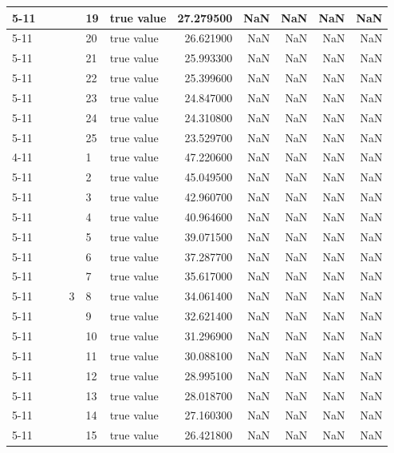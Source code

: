 \begin{tabular}{llllllrrrrr}
\cline{5-11}
 &  &  &  & 19 & true value & 27.279500 & NaN & NaN & NaN & NaN \\
\cline{5-11}
 &  &  &  & 20 & true value & 26.621900 & NaN & NaN & NaN & NaN \\
\cline{5-11}
 &  &  &  & 21 & true value & 25.993300 & NaN & NaN & NaN & NaN \\
\cline{5-11}
 &  &  &  & 22 & true value & 25.399600 & NaN & NaN & NaN & NaN \\
\cline{5-11}
 &  &  &  & 23 & true value & 24.847000 & NaN & NaN & NaN & NaN \\
\cline{5-11}
 &  &  &  & 24 & true value & 24.310800 & NaN & NaN & NaN & NaN \\
\cline{5-11}
 &  &  &  & 25 & true value & 23.529700 & NaN & NaN & NaN & NaN \\
\cline{4-11} \cline{5-11}
 &  &  & \multirow[t]{25}{*}{3} & 1 & true value & 47.220600 & NaN & NaN & NaN & NaN \\
\cline{5-11}
 &  &  &  & 2 & true value & 45.049500 & NaN & NaN & NaN & NaN \\
\cline{5-11}
 &  &  &  & 3 & true value & 42.960700 & NaN & NaN & NaN & NaN \\
\cline{5-11}
 &  &  &  & 4 & true value & 40.964600 & NaN & NaN & NaN & NaN \\
\cline{5-11}
 &  &  &  & 5 & true value & 39.071500 & NaN & NaN & NaN & NaN \\
\cline{5-11}
 &  &  &  & 6 & true value & 37.287700 & NaN & NaN & NaN & NaN \\
\cline{5-11}
 &  &  &  & 7 & true value & 35.617000 & NaN & NaN & NaN & NaN \\
\cline{5-11}
 &  &  &  & 8 & true value & 34.061400 & NaN & NaN & NaN & NaN \\
\cline{5-11}
 &  &  &  & 9 & true value & 32.621400 & NaN & NaN & NaN & NaN \\
\cline{5-11}
 &  &  &  & 10 & true value & 31.296900 & NaN & NaN & NaN & NaN \\
\cline{5-11}
 &  &  &  & 11 & true value & 30.088100 & NaN & NaN & NaN & NaN \\
\cline{5-11}
 &  &  &  & 12 & true value & 28.995100 & NaN & NaN & NaN & NaN \\
\cline{5-11}
 &  &  &  & 13 & true value & 28.018700 & NaN & NaN & NaN & NaN \\
\cline{5-11}
 &  &  &  & 14 & true value & 27.160300 & NaN & NaN & NaN & NaN \\
\cline{5-11}
 &  &  &  & 15 & true value & 26.421800 & NaN & NaN & NaN & NaN \\

\end{tabular}
